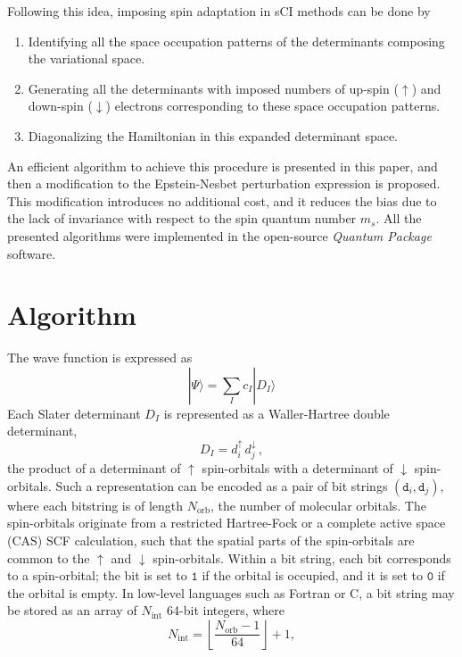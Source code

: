 \documentclass[aip,jcp,reprint,showkeys]{revtex4-1}
\newcommand{\ket}[1]{|#1\rangle}
\newcommand{\md}{\mathtt{d}}
\newcommand{\up}{\uparrow}
\newcommand{\dn}{\downarrow}
\newcommand{\Nint}{{N_\text{int}}}
\newcommand{\Norb}{{N_\text{orb}}}
\newcommand{\one}{{\texttt{1}}}
\newcommand{\zero}{{\texttt{0}}}
\newcommand{\sci}{sCI}
\begin{document}
Following this idea, imposing spin adaptation in {\sci} methods can be done by 
\begin{enumerate}
\item Identifying all the space occupation patterns of the determinants composing
      the variational space.
\item Generating all the determinants with imposed numbers of up-spin ($\up$) and
      down-spin ($\dn$) electrons corresponding to these space occupation patterns.
\item Diagonalizing the Hamiltonian in this expanded determinant space.
\end{enumerate}
An efficient algorithm to achieve this procedure is presented in this paper,
and then a modification to the Epstein-Nesbet perturbation expression is
proposed. This modification introduces no additional cost, and it reduces the
bias due to the lack of invariance with respect to the spin quantum number $m_s$.
All the presented algorithms were implemented in the open-source
\emph{Quantum Package} software.\cite{qp}



\section{Algorithm}

The wave function is expressed as
\begin{equation}
\ket{\Psi} = \sum_I c_I \ket{D_I}
\end{equation}
Each Slater determinant $D_I$ is represented as a Waller-Hartree double
determinant,\cite{Pauncz_1989}
\begin{equation}
 \label{eq:di}
 D_I = d_i^\up \, d_j^\dn\, ,
\end{equation}
the product of a determinant of $\up$ spin-orbitals with a determinant of $\dn$
spin-orbitals.
Such a representation can be encoded as a pair of bit strings $(\md_i,\md_j)$,
where each bitstring is of length $\Norb$, the number of molecular orbitals.
The spin-orbitals originate from a restricted Hartree-Fock or a complete
active space (CAS) SCF calculation, such that the spatial parts of the
spin-orbitals are common to the $\up$ and $\dn$ spin-orbitals.
Within a bit string, each bit corresponds to a spin-orbital; the bit is set
to $\one$ if the orbital is occupied, and it is set to $\zero$ if the orbital is empty.
In low-level languages such as Fortran or C, a bit
string may be stored as an array of $\Nint$ 64-bit integers, where 
\begin{equation}
  \Nint = \left \lfloor \frac{\Norb-1}{64} \right \rfloor + 1,
\end{equation}
\end{document}
